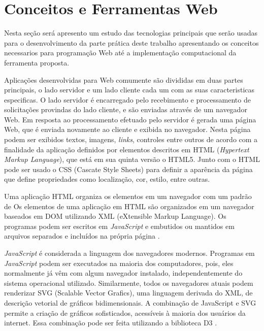 \section{Conceitos e Ferramentas Web}

Nesta seção será apresento um estudo das tecnologias principais que serão usadas para o desenvolvimento da parte prática deste trabalho apresentando os conceitos necessarios para programação Web até a implementação computacional da ferramenta proposta.

Aplicações desenvolvidas para Web comumente são divididas em duas partes principais, o lado servidor e um lado cliente cada um com as suas caracteristicas especificas. O lado servidor é encarregado pelo recebimento e processamento de solicitações provindas do lado cliente, e são enviadas através de um navegador Web. 
Em resposta ao processamento efetuado pelo servidor é gerada uma página Web, que é enviada novamente ao cliente e exibida no navegador.  Nesta página podem ser exibidos textos, imagens, \textit{links}, controles entre outros de acordo com a finalidade da aplicação definidos por elementos descritos em HTML (\textit{Hypertext Markup Language}), que está em sua quinta versão o HTML5. Junto com o HTML pode ser usado o CSS (Cascate Style Sheets) para definir a aparência da página que define propriedades como localização, cor, estilo, entre outras\cite{pagliosa2016visualizaccao}.

Uma aplicação HTML organiza os elementos em um navegador com um padrão de
Os elementos de uma aplicação em HTML são organizados em um navegador baseados em DOM utilizando XML (eXtensible Markup Language). Os programas podem ser escritos em \textit{JavaScript} e embutidos ou mantidos em arquivos separados e incluídos na própria página \cite{wang2013definitive} \cite{pagliosa2016visualizaccao}.

\textit{JavaScript} é considerada a linguagem dos navegadores modernos. Programas em \textit{JavaScript} podem ser executados na maioria dos computadores, pois, eles normalmente já vêm com algum navegador instalado, independentemente do sistema operacional utilizado. Similarmente, todos os navegadores atuais podem renderizar SVG (Scalable Vector Grafics), uma linguagem derivada do XML, de descrição vetorial de gráficos bidimensionais. A combinação de JavaScript e SVG permite a criação de gráficos sofisticados, acessíveis à maioria dos usuários da internet. Essa combinação pode ser feita utilizando a biblioteca D3 \cite{pagliosa2016visualizaccao}.

